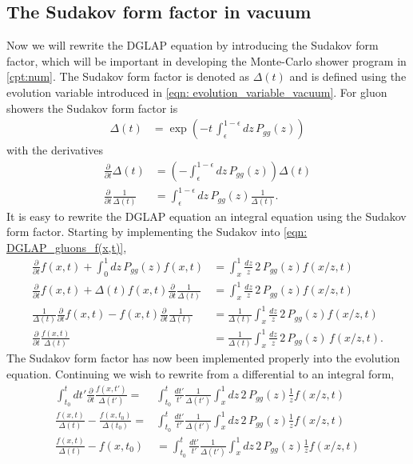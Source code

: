 \documentclass[main.tex]{subfiles}
\begin{document}
\subsection{The Sudakov form factor in vacuum}
Now we will rewrite the DGLAP equation by introducing the Sudakov form factor, which will be important in developing the Monte-Carlo shower program in \autoref{cpt:num}. The Sudakov form factor is denoted as \(\Delta(t)\) and is defined using the evolution variable introduced in \autoref{eqn: evolution_variable_vacuum}. For gluon showers the Sudakov form factor is
\begin{align}\label{eqn: sudakov_form_factor_dasguptalike}
    \Delta (t) &= \exp\left(-t\, \int_{\epsilon}^{1-\epsilon}dz \, P_{gg}(z)\right)
\end{align}
with the derivatives
\begin{align}
    \frac{\partial}{\partial t} \Delta (t) &= \left(- \int_{\epsilon}^{1-\epsilon} dz\, P_{gg}(z) \right) \Delta(t) \nonumber\\
    \frac{\partial}{\partial t} \frac{1}{\Delta(t)}&= \int_{\epsilon}^{1-\epsilon} dz\, P_{gg}(z) \frac{1}{\Delta(t)}.
\end{align}
It is easy to rewrite the DGLAP equation an integral equation using the Sudakov form factor.
Starting by implementing the Sudakov into \autoref{eqn: DGLAP_gluons_f(x,t)},
\begin{align}
    \frac{\partial}{\partial t} f(x,t) + \int_{0}^{1} dz \, P_{gg}(z) f(x,t) &= \int_{x}^{1} \frac{dz}{z} \,2\, P_{gg}(z) f(x/z ,t) \nonumber \\
    \frac{\partial}{\partial t} f(x,t) + \Delta(t) f(x,t) \frac{\partial}{\partial t} \frac{1}{\Delta(t)} &= \int_{x}^{1} \frac{dz}{z} \,2\, P_{gg}(z) f(x/z ,t) \nonumber \\
    \frac{1}{\Delta(t)} \frac{\partial}{\partial t} f(x,t) - f(x,t) \frac{\partial}{\partial t} \frac{1}{\Delta(t)} &= \frac{1}{\Delta(t)} \int_{x}^{1} \frac{dz}{z} \,2\, P_{gg}(z) f(x/z ,t) \nonumber \\
    \frac{\partial }{\partial t} \frac{f(x,t)}{\Delta (t)} &= \frac{1}{\Delta(t)} \int_{x}^{1} \frac{dz}{z} \,2\, P_{gg}(z) \, f(x/z, t).
\end{align}
The Sudakov form factor has now been implemented properly into the evolution equation. Continuing we wish to rewrite from a differential to an integral form,
\begin{align}
    \int_{t_0}^t dt' \frac{\partial}{\partial t} \frac{f(x,t')}{\Delta(t')} = &\int_{t_0}^{t} \frac{dt'}{t'} \frac{1}{\Delta(t')} \int_{x}^{1} dz \,2\, P_{gg}(z) \frac{1}{z} f(x/z, t) \nonumber\\
    \frac{f(x,t)}{\Delta(t)} - \frac{f(x,t_0)}{\Delta(t_0)} = &\int_{t_0}^{t} \frac{dt'}{t'} \frac{1}{\Delta(t')} \int_{x}^{1} dz \,2\, P_{gg}(z) \frac{1}{z} f(x/z, t) \nonumber\\
    \frac{f(x,t)}{\Delta(t)} - f(x,t_0) &= \int_{t_0}^{t} \frac{dt'}{t'} \frac{1}{\Delta(t')} \int_{x}^{1} dz  \,2\, P_{gg}(z) \frac{1}{z} f(x/z, t)
\end{align}
\end{document}

